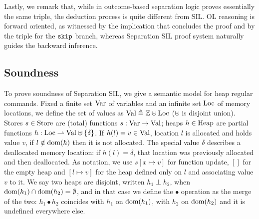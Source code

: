 Lastly, we remark that, while in \cite[Figure~6]{ZDS23} outcome-based separation logic proves essentially the same triple, the deduction process is quite different from SIL.
OL reasoning is forward oriented, as witnessed by the implication that concludes the proof and by the triple for the $\texttt{skip}$ branch, whereas Separation SIL proof system naturally guides the backward inference.

\subsection{Soundness}
To prove soundness of Separation SIL, we give a semantic model for heap regular commands.
Fixed a finite set $\text{Var}$ of variables and an infinite set $\text{Loc}$ of memory locations, we define the set of values as $\text{Val} \triangleq \mathbb{Z} \uplus \text{Loc}$ ($\uplus$ is disjoint union).
Stores $s \in \text{Store}$ are (total) functions $s: \text{Var} \rightarrow \text{Val}$; heaps $h \in \text{Heap}$ are partial functions $h: \text{Loc} \rightharpoonup \text{Val} \uplus \{ \delta \}$. If $h(l) = v \in \text{Val}$, location $l$ is allocated and holds value $v$, if $l \notin \text{dom}(h)$ then it is not allocated. The special value $\delta$ describes a deallocated memory location: if $h(l) = \delta$, that location was previously allocated and then deallocated.
As notation, we use $s[x \mapsto v]$ for function update, $[]$ for the empty heap and $[l \mapsto v]$ for the heap defined only on $l$ and associating value $v$ to it.
We say two heaps are disjoint, written $h_1 \perp h_2$, when $\text{dom}(h_1) \cap \text{dom}(h_2) = \emptyset$, and in that case we define the $\bullet$ operation as the merge of the two: $h_1 \bullet h_2$ coincides with $h_1$ on $\text{dom}(h_1)$, with $h_2$ on $\text{dom}(h_2)$ and it is undefined everywhere else.


